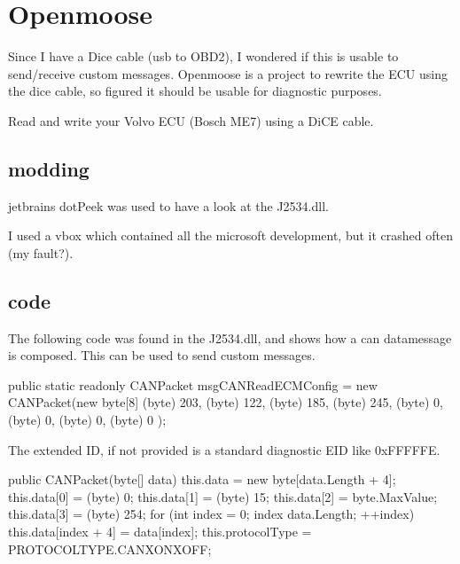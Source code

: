 \documentclass[letterpaper,10pt,english]{sphinxmanual}
\begin{document}
\chapter{Openmoose}
\label{\detokenize{openmoose:openmoose}}\label{\detokenize{openmoose::doc}}
\sphinxAtStartPar
Since I have a Dice cable (usb to OBD2), I wondered if this is usable to send/receive custom messages. Openmoose is a project to re\sphinxhyphen{}write the ECU using the dice cable, so figured it should be usable for diagnostic purposes.

\sphinxAtStartPar
{}

\sphinxAtStartPar
{}

\sphinxAtStartPar
Read and write your Volvo ECU (Bosch ME7) using a DiCE cable.


\section{modding}
\label{\detokenize{openmoose:modding}}
\sphinxAtStartPar
jetbrains dotPeek was used to have a look at the J2534.dll.

\sphinxAtStartPar
I used a vbox which contained all the microsoft development, but it crashed often (my fault?).

\sphinxAtStartPar
{}


\section{code}
\label{\detokenize{openmoose:code}}
\sphinxAtStartPar
The following code was found in the J2534.dll, and shows how a can data\sphinxhyphen{}message is composed. This can be used to send custom messages.

\begin{sphinxVerbatim}[commandchars=\\\{\}]
   public static readonly CANPacket msgCANReadECMConfig = new CANPacket(new byte[8]
\PYGZob{}
  (byte) 203,
  (byte) 122,
  (byte) 185,
  (byte) 245,
  (byte) 0,
  (byte) 0,
  (byte) 0,
  (byte) 0
\PYGZcb{});
\end{sphinxVerbatim}

\sphinxAtStartPar
The extended ID, if not provided is a standard diagnostic EID like 0xFFFFFE.

\begin{sphinxVerbatim}[commandchars=\\\{\}]
public CANPacket(byte[] data)
\PYGZob{}
  this.data = new byte[data.Length + 4];
  this.data[0] = (byte) 0;
  this.data[1] = (byte) 15;
  this.data[2] = byte.MaxValue;
  this.data[3] = (byte) 254;
  for (int index = 0; index \PYGZlt{} data.Length; ++index)
    this.data[index + 4] = data[index];
  this.protocolType = PROTOCOL\PYGZus{}TYPE.CAN\PYGZus{}XON\PYGZus{}XOFF;
\PYGZcb{}
\end{sphinxVerbatim}
\end{document}
